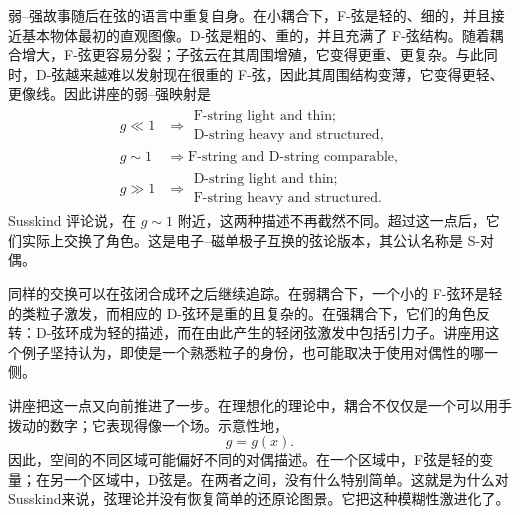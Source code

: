 弱--强故事随后在弦的语言中重复自身。在小耦合下，F-弦是轻的、细的，并且接近基本物体最初的直观图像。D-弦是粗的、重的，并且充满了 F-弦结构。随着耦合增大，F-弦更容易分裂；子弦云在其周围增殖，它变得更重、更复杂。与此同时，D-弦越来越难以发射现在很重的 F-弦，因此其周围结构变薄，它变得更轻、更像线。因此讲座的弱--强映射是
\begin{align}
g \ll 1
&\Rightarrow
\begin{gathered}
\text{F-string light and thin;}\\
\text{D-string heavy and structured},
\end{gathered}\\
g \sim 1
&\Rightarrow
\text{F-string and D-string comparable},\\
g \gg 1
&\Rightarrow
\begin{gathered}
\text{D-string light and thin;}\\
\text{F-string heavy and structured}.
\end{gathered}
\end{align}
Susskind 评论说，在 \(g\sim 1\) 附近，这两种描述不再截然不同。超过这一点后，它们实际上交换了角色。这是电子--磁单极子互换的弦论版本，其公认名称是 S-对偶。

同样的交换可以在弦闭合成环之后继续追踪。在弱耦合下，一个小的 F-弦环是轻的类粒子激发，而相应的 D-弦环是重的且复杂的。在强耦合下，它们的角色反转：D-弦环成为轻的描述，而在由此产生的轻闭弦激发中包括引力子。讲座用这个例子坚持认为，即使是一个熟悉粒子的身份，也可能取决于使用对偶性的哪一侧。

讲座把这一点又向前推进了一步。在理想化的理论中，耦合不仅仅是一个可以用手拨动的数字；它表现得像一个场。示意性地，
\begin{equation}
g = g(x).
\end{equation}
因此，空间的不同区域可能偏好不同的对偶描述。在一个区域中，F弦是轻的变量；在另一个区域中，D弦是。在两者之间，没有什么特别简单。这就是为什么对Susskind来说，弦理论并没有恢复简单的还原论图景。它把这种模糊性激进化了。


\begin{classroomqa}
\end{classroomqa}

